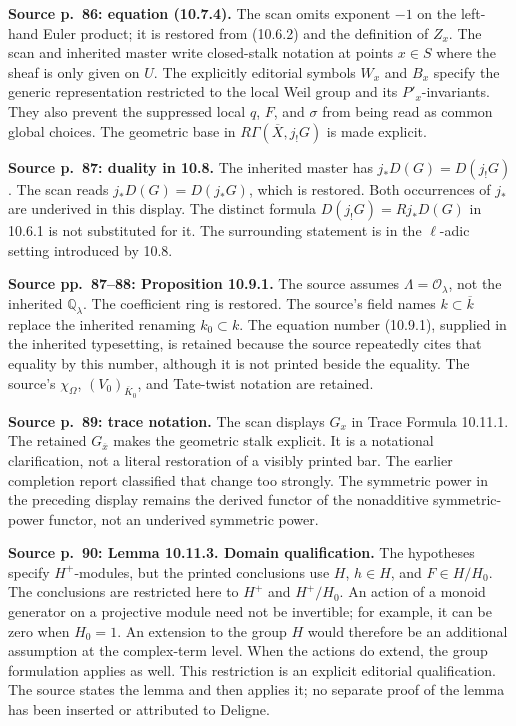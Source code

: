\documentclass[10pt,letterpaper]{article}
\newcommand{\Q}{\mathbb Q}
\begin{document}
\begin{description}[style=nextline,leftmargin=2.6em,labelwidth=2.2em,font=\normalfont\bfseries]
\item[E04] \textbf{Source p.~86: equation (10.7.4).} The scan omits exponent \(-1\) on the left-hand Euler product; it is restored from (10.6.2) and the definition of \(Z_x\). The scan and inherited master write closed-stalk notation at points \(x\in S\) where the sheaf is only given on \(U\). The explicitly editorial symbols \(W_x\) and \(B_x\) specify the generic representation restricted to the local Weil group and its \(P'_x\)-invariants. They also prevent the suppressed local \(q\), \(F\), and \(\sigma\) from being read as common global choices. The geometric base in \(R\Gamma(\overline X,j_!G)\) is made explicit.

\item[E05] \textbf{Source p.~87: duality in 10.8.} The inherited master has \(j_*D(G)=D(j_!G)\). The scan reads \(j_*D(G)=D(j_*G)\), which is restored. Both occurrences of \(j_*\) are underived in this display. The distinct formula \(D(j_!G)=Rj_*D(G)\) in 10.6.1 is not substituted for it. The surrounding statement is in the \(\ell\)-adic setting introduced by 10.8.

\item[E06] \textbf{Source pp.~87--88: Proposition 10.9.1.} The source assumes \(\Lambda=\mathcal O_\lambda\), not the inherited \(\Q_\lambda\). The coefficient ring is restored. The source's field names \(k\subset\overline k\) replace the inherited renaming \(k_0\subset k\). The equation number (10.9.1), supplied in the inherited typesetting, is retained because the source repeatedly cites that equality by this number, although it is not printed beside the equality. The source's \(\chi_\Omega\), \((V_0)_{\overline K_0}\), and Tate-twist notation are retained.

\item[E07] \textbf{Source p.~89: trace notation.} The scan displays \(G_x\) in Trace Formula 10.11.1. The retained \(G_{\overline x}\) makes the geometric stalk explicit. It is a notational clarification, not a literal restoration of a visibly printed bar. The earlier completion report classified that change too strongly. The symmetric power in the preceding display remains the derived functor of the nonadditive symmetric-power functor, not an underived symmetric power.

\item[E08] \textbf{Source p.~90: Lemma 10.11.3. Domain qualification.} The hypotheses specify \(H^+\)-modules, but the printed conclusions use \(H\), \(h\in H\), and \(F\in H/H_0\). The conclusions are restricted here to \(H^+\) and \(H^+/H_0\). An action of a monoid generator on a projective module need not be invertible; for example, it can be zero when \(H_0=1\). An extension to the group \(H\) would therefore be an additional assumption at the complex-term level. When the actions do extend, the group formulation applies as well. This restriction is an explicit editorial qualification. The source states the lemma and then applies it; no separate proof of the lemma has been inserted or attributed to Deligne.


\end{description}
\end{document}
